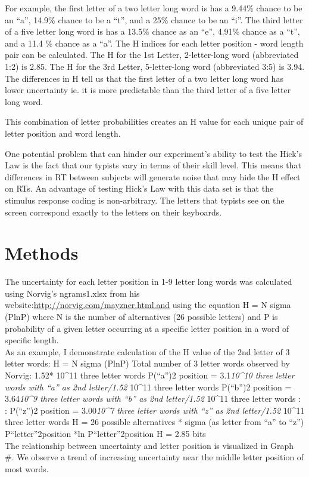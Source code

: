 \documentclass[man]{apa6}
\theoremstyle{definition}
\theoremstyle{definition}
\theoremstyle{definition}
\theoremstyle{remark}
\begin{document}
For example, the first letter of a two letter long word is has a 9.44\%
chance to be an \enquote{a}, 14.9\% chance to be a \enquote{t}, and a
25\% chance to be an \enquote{i}. The third letter of a five letter long
word is has a 13.5\% chance as an \enquote{e}, 4.91\% chance as a
\enquote{t}, and a 11.4 \% chance as a \enquote{a}. The H indices for
each letter position - word length pair can be calculated. The H for the
1st Letter, 2-letter-long word (abbreviated 1:2) is 2.85. The H for the
3rd Letter, 5-letter-long word (abbreviated 3:5) is 3.94. The
differences in H tell us that the first letter of a two letter long word
has lower uncertainty ie. it is more predictable than the third letter
of a five letter long word.

This combination of letter probabilities creates an H value for each
unique pair of letter position and word length.

One potential problem that can hinder our experiment's ability to test
the Hick's Law is the fact that our typists vary in terms of their skill
level. This means that differences in RT between subjects will generate
noise that may hide the H effect on RTs. An advantage of testing Hick's
Law with this data set is that the stimulus response coding is
non-arbitrary. The letters that typists see on the screen correspond
exactly to the letters on their keyboards.

\section{Methods}\label{methods}

The uncertainty for each letter position in 1-9 letter long words was
calculated using Norvig's ngrams1.xlsx from his
website:\url{http://norvig.com/mayzner.html.and} using the equation H =
N sigma (PlnP) where N is the number of alternatives (26 possible
letters) and P is probability of a given letter occurring at a specific
letter position in a word of specific length.\\
As an example, I demonstrate calculation of the H value of the 2nd
letter of 3 letter words: H = N sigma (PlnP) Total number of 3 letter
words observed by Norvig: 1.52* 10\^{}11 three letter words
P(\enquote{a})2 position = 3.1\emph{10\^{}10 three letter words with
\enquote{a} as 2nd letter/1.52} 10\^{}11 three letter words
P(\enquote{b})2 position = 3.64\emph{10\^{}9 three letter words with
\enquote{b} as 2nd letter/1.52} 10\^{}11 three letter words : :
P(\enquote{z})2 position = 3.00\emph{10\^{}7 three letter words with
\enquote{z} as 2nd letter/1.52} 10\^{}11 three letter words H = 26
possible alternatives * sigma (as letter from \enquote{a} to
\enquote{z}) P\enquote{letter}2position *ln P\enquote{letter}2position H
= 2.85 bits\\
The relationship between uncertainty and letter position is visualized
in Graph \#. We observe a trend of increasing uncertainty near the
middle letter position of most words.
\end{document}
